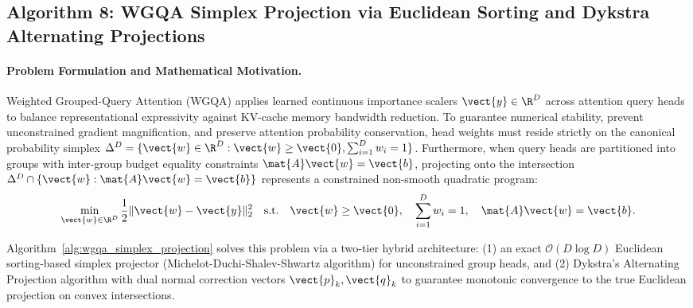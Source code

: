 \subsection{Algorithm 8: WGQA Simplex Projection via Euclidean Sorting and Dykstra Alternating Projections}
\label{subsec:alg_wgqa_simplex_projection}

\paragraph{Problem Formulation and Mathematical Motivation.}
Weighted Grouped-Query Attention (WGQA) applies learned continuous importance scalers $\vect{y} \in \R^D$ across attention query heads to balance representational expressivity against KV-cache memory bandwidth reduction. To guarantee numerical stability, prevent unconstrained gradient magnification, and preserve attention probability conservation, head weights must reside strictly on the canonical probability simplex $\Delta^D = \{ \vect{w} \in \R^D : \vect{w} \ge \vect{0}, \sum_{i=1}^D w_i = 1 \}$. Furthermore, when query heads are partitioned into groups with inter-group budget equality constraints $\mat{A}\vect{w} = \vect{b}$, projecting onto the intersection $\Delta^D \cap \{\vect{w} : \mat{A}\vect{w} = \vect{b}\}$ represents a constrained non-smooth quadratic program:
\begin{equation}
    \min_{\vect{w} \in \R^D} \frac{1}{2} \|\vect{w} - \vect{y}\|_2^2 \quad \text{s.t.} \quad \vect{w} \ge \vect{0}, \quad \sum_{i=1}^D w_i = 1, \quad \mat{A}\vect{w} = \vect{b}.
    \label{eq:wgqa_opt_problem}
\end{equation}

Algorithm~\ref{alg:wgqa_simplex_projection} solves this problem via a two-tier hybrid architecture: (1) an exact $\mathcal{O}(D \log D)$ Euclidean sorting-based simplex projector (Michelot-Duchi-Shalev-Shwartz algorithm) for unconstrained group heads, and (2) Dykstra's Alternating Projection algorithm with dual normal correction vectors $\vect{p}_k, \vect{q}_k$ to guarantee monotonic convergence to the true Euclidean projection on convex intersections.

